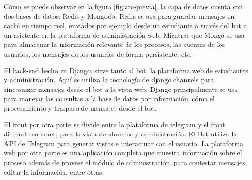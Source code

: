         \par Cómo se puede observar en la figura \ref{fig:arc-previa}, la capa de datos cuenta con dos bases de datos: Redis y Mongodb. Redis se usa para guardar mensajes en caché en tiempo real, enviados por ejemplo desde un estudiante a través del bot a un asistente en la plataforma de administración web. Mientras que Mongo se usa para almacenar la información relevante de los procesos, las cuentas de los usuarios, los mensajes de los usuarios de forma persistente, etc.
        \par El back-end hecho en Django, sirve tanto al bot, la plataforma web de estudiantes y administración. Aquí se utiliza la tecnología de django channels para sincronizar mensajes desde el bot a la vista web. Django principalmente se usa para manejar las consultas a la base de datos por información, cómo el procesamiento y traspaso de mensajes desde el bot.
        \par El front por otra parte se divide entre la plataforma de telegram y el front diseñado en react, para la vista de alumnos y administración. El Bot utiliza la API de \gls{Telegram} para generar vistas e interactuar con el usuario. La plataforma web por otra parte es una aplicación completa que muestra información sobre el proceso además de proveer el módulo de administración, para contestar mensajes, editar la información, entre otras.

